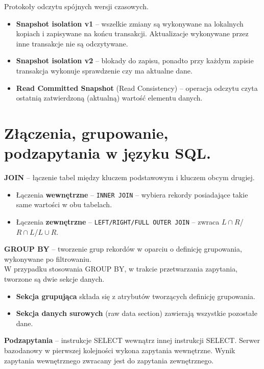 \documentclass[main.tex]{subfiles}
\begin{document}
    Protokoły odczytu spójnych wersji czasowych.
    \begin{itemize}
        \item \textbf{Snapshot isolation v1} -- wszelkie zmiany są wykonywane na lokalnych kopiach i zapisywane na
        końcu transakcji. Aktualizacje wykonywane przez inne transakcje nie są odczytywane.
        \item \textbf{Snapshot isolation v2} -- blokady do zapisu, ponadto przy każdym zapisie
        transakcja wykonuje sprawdzenie czy ma aktualne dane.
        \item \textbf{Read Committed Snapshot} (Read Consistency) -- operacja odczytu czyta ostatnią zatwierdzoną (aktualną)
        wartość elementu danych.
    \end{itemize}


    \section{Złączenia, grupowanie, podzapytania w języku SQL.}

    \textbf{JOIN} -- łączenie tabel między kluczem podstawowym i kluczem obcym drugiej.
    \begin{itemize}[noitemsep]
        \item Łączenia \textbf{wewnętrzne} -- \texttt{INNER JOIN} -- wybiera rekordy posiadające takie same wartości w
        obu tabelach.
        \item Łączenia \textbf{zewnętrzne} -- \texttt{LEFT/RIGHT/FULL OUTER JOIN} -- zwraca $L \cap R$/$R \cap L$/$L \cup R$.
    \end{itemize}

    \noindent \textbf{GROUP BY} -- tworzenie grup rekordów w oparciu o definicję grupowania, wykonywane po filtrowaniu.\\

    W przypadku stosowania GROUP BY, w trakcie przetwarzania zapytania, tworzone są dwie sekcje danych.
    \begin{itemize}[noitemsep]
        \item \textbf{Sekcja grupująca} składa się z atrybutów tworzących definicję grupowania.
        \item \textbf{Sekcja danych surowych} (raw data section) zawierają wszystkie pozostałe dane.
    \end{itemize}

    \noindent \textbf{Podzapytania} -- instrukcje SELECT wewnątrz innej instrukcji SELECT. Serwer bazodanowy w pierwszej
    kolejności wykona zapytania wewnętrzne. Wynik zapytania wewnętrznego zwracany jest do zapytania zewnętrznego.
\end{document}
